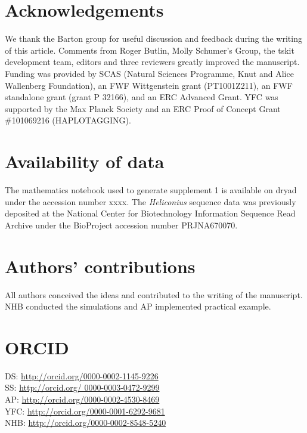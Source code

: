 \documentclass[twocolumn]{bmcart}%
\begin{document}
\begin{backmatter}

\section*{Acknowledgements}%
We thank the Barton group for useful discussion and feedback during the writing of this article. Comments from Roger Butlin, Molly Schumer’s Group, the tskit development team, editors and three reviewers greatly improved the manuscript. Funding was provided by SCAS (Natural Sciences Programme, Knut and Alice Wallenberg Foundation), an FWF Wittgenstein grant (PT1001Z211), an FWF standalone grant (grant P 32166), and an ERC Advanced Grant. YFC was supported by the Max Planck Society and an ERC Proof of Concept Grant \#101069216 (HAPLOTAGGING). 

\section*{Availability of data}%
The mathematics notebook used to generate supplement 1 is available on dryad under the accession number xxxx. The \textit{Heliconius} sequence data was previously deposited at the National Center for Biotechnology Information Sequence Read Archive under the BioProject accession number PRJNA670070.

\section*{Authors' contributions}
All authors conceived the ideas and contributed to the writing of the manuscript. NHB conducted the simulations and AP implemented practical example.

\section*{ORCID}
DS: \url{http://orcid.org/0000-0002-1145-9226} \\
SS: \url{http://orcid.org/ 0000-0003-0472-9299} \\
AP: \url{http://orcid.org/0000-0002-4530-8469} \\
YFC: \url{http://orcid.org/0000-0001-6292-9681} \\
NHB: \url{http://orcid.org/0000-0002-8548-5240}


\begin{thebibliography}{xx}

\end{thebibliography}


\end{backmatter}
\end{document}
